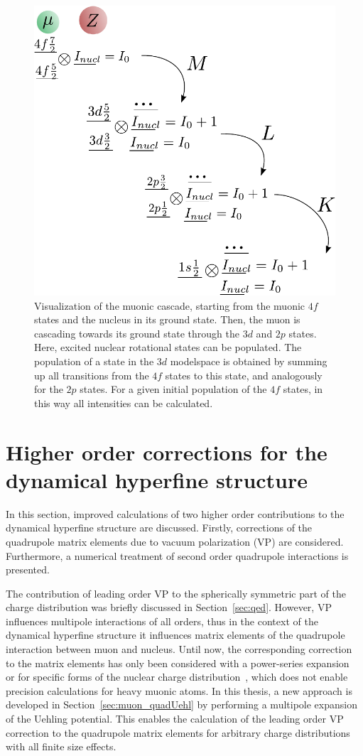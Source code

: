 %
\begin{figure}%
\centering
\includegraphics[width=0.62\linewidth]{pics/cascade.pdf}%
\caption{Visualization of the muonic cascade, starting from the muonic $4f$ states and the nucleus in its ground state. Then, the muon is cascading towards its ground state through the $3d$ and $2p$ states. Here, excited nuclear rotational states can be populated. The population of a state in the $3d$ modelspace is obtained by summing up all transitions from the $4f$ states to this state, and analogously for the $2p$ states. For a given initial population of the $4f$ states, in this way all intensities can be calculated.}%
\label{fig:cascade}%
\end{figure}
%
\newpage
\section{Higher order corrections for the dynamical hyperfine structure}
\label{sec:higherorder}
In this section, improved calculations of two higher order contributions to the dynamical hyperfine structure are discussed. Firstly, corrections of the quadrupole matrix elements due to vacuum polarization (VP) are considered. Furthermore, a numerical treatment of second order quadrupole interactions is presented.

The contribution of leading order VP to the spherically symmetric part of the charge distribution was briefly discussed in Section~\ref{sec:qed}. However, VP influences multipole interactions of all orders, thus in the context of the dynamical hyperfine structure it influences matrix elements of the quadrupole interaction between muon and nucleus. Until now, the corresponding correction to the matrix elements has only been considered with a power-series expansion~\cite{Fricke1969vp,zehnder1975} or for specific forms of the nuclear charge distribution~\cite{pearson1963}, which does not enable precision calculations for heavy muonic atoms. In this thesis, a new approach is developed in Section~\ref{sec:muon_quadUehl} by performing a multipole expansion of the Uehling potential. This enables the calculation of the leading order VP correction to the quadrupole matrix elements for arbitrary charge distributions with all finite size effects.

